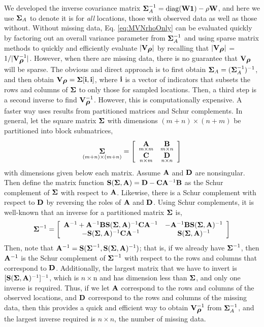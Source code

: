 \documentclass[11pt, titlepage]{article}\usepackage[]{graphicx}\usepackage[]{color}
\begin{document}
\begin{spacing}{1.9}
\begin{flushleft}
We developed the inverse covariance matrix $\mbox{\boldmath $\Sigma$}_A^{-1} = \textrm{diag}(\mathbf{W}\mathbf{1}) - \rho\mathbf{W}$, and here we use $\mbox{\boldmath $\Sigma$}_A$ to denote it is for \emph{all} locations, those with observed data as well as those without. Without missing data, Eq. \ref{eq:MVNrhoOnly} can be evaluated quickly by factoring out an overall variance parameter from $\mbox{\boldmath $\Sigma$}_A^{-1}$ and using sparse matrix methods to quickly and efficiently evaluate $|\mathbf{V}_{\mbox{\boldmath $\rho$}}|$ by recalling that $|\mathbf{V}_{\mbox{\boldmath $\rho$}}|$ = $1/|\mathbf{V}^{-1}_{\mbox{\boldmath $\rho$}}|$.  However, when there are missing data, there is no guarantee that $\mathbf{V}_{\mbox{\boldmath $\rho$}}$ will be sparse.  The obvious and direct approach is to first obtain $\mbox{\boldmath $\Sigma$}_A = (\mbox{\boldmath $\Sigma$}_A^{-1})^{-1}$, and then obtain $\mathbf{V}_{\mbox{\boldmath $\rho$}} = \mbox{\boldmath $\Sigma$}[\mathbf{i},\mathbf{i}]$, where $\mathbf{i}$ is a vector of indicators that subsets the rows and columns of $\mbox{\boldmath $\Sigma$}$ to only those for sampled locations.  Then, a third step is a second inverse to find $\mathbf{V}_{\mbox{\boldmath $\rho$}}^{-1}$.  However, this is computationally expensive.  A faster way uses results from partitioned matrices and Schur complements.  In general, let the square matrix $\mbox{\boldmath $\Sigma$}$ with dimensions $(m + n) \times (n + m)$ be partitioned into block submatrices,
\[
  \underset{(m+n) \times (m+n)}{\mbox{\boldmath $\Sigma$}} = \left[
    \begin{array}{cc}
	    \underset{m \times m}{\mathbf{A}} & \underset{m \times n}{\mathbf{B}} \\
	    \underset{n \times m}{\mathbf{C}} & \underset{n \times n}{\mathbf{D}}
    \end{array}
  \right]
\]
with dimensions given below each matrix. Assume $\mathbf{A}$ and $\mathbf{D}$ are nonsingular.  Then define the matrix function $\mathbf{S}(\mbox{\boldmath $\Sigma$},\mathbf{A}) = \mathbf{D} - \mathbf{C}\mathbf{A}^{-1}\mathbf{B}$ as the Schur complement of $\mbox{\boldmath $\Sigma$}$ with respect to $\mathbf{A}$.  Likewise, there is a Schur complement with respect to $\mathbf{D}$ by reversing the roles of $\mathbf{A}$ and $\mathbf{D}$.  Using Schur complements, it is well-known \citep[e.g.,][p. 97]{Harv:matr:1997} that an inverse for a partitioned matrix $\mbox{\boldmath $\Sigma$}$ is,
\[
  \mbox{\boldmath $\Sigma$}^{-1} = \left[
    \begin{array}{cc}
      \mathbf{A}^{-1} + \mathbf{A}^{-1}\mathbf{B}\mathbf{S}(\mbox{\boldmath $\Sigma$},\mathbf{A})^{-1}\mathbf{C}\mathbf{A}^{-1} & -\mathbf{A}^{-1}\mathbf{B}\mathbf{S}(\mbox{\boldmath $\Sigma$},\mathbf{A})^{-1} \\
      -\mathbf{S}(\mbox{\boldmath $\Sigma$},\mathbf{A})^{-1}\mathbf{C}\mathbf{A}^{-1} & \mathbf{S}(\mbox{\boldmath $\Sigma$},\mathbf{A})^{-1}
    \end{array}
  \right]
\]
Then, note that $\mathbf{A}^{-1} = \mathbf{S}(\mbox{\boldmath $\Sigma$}^{-1}, \mathbf{S}(\mbox{\boldmath $\Sigma$},\mathbf{A})^{-1})$; that is, if we already have $\mbox{\boldmath $\Sigma$}^{-1}$, then $\mathbf{A}^{-1}$ is the Schur complement of $\mbox{\boldmath $\Sigma$}^{-1}$ with respect to the rows and columns that correspond to $\mathbf{D}$.  Additionally, the largest matrix that we have to invert is $[\mathbf{S}(\mbox{\boldmath $\Sigma$},\mathbf{A})^{-1}]^{-1}$, which is $n \times $n and has dimension less than $\mbox{\boldmath $\Sigma$}$, and only one inverse is required. Thus, if we let $\mathbf{A}$ correspond to the rows and columns of the observed locations, and $\mathbf{D}$ correspond to the rows and columns of the missing data, then this provides a quick and efficient way to obtain $\mathbf{V}_{\mbox{\boldmath $\rho$}}^{-1}$ from $\mbox{\boldmath $\Sigma$}_A^{-1}$, and the largest inverse required is $n \times n$, the number of missing data.


\end{flushleft}
\end{spacing}
\end{document}
